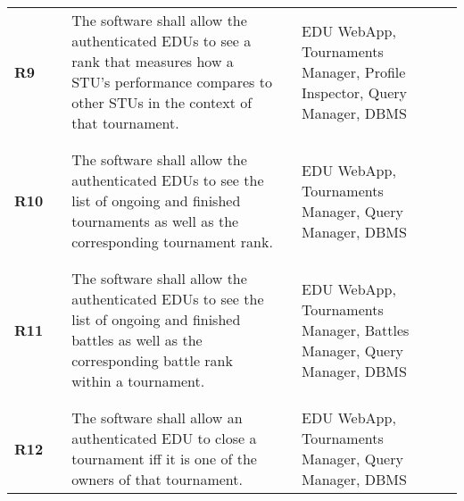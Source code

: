 \begin{longtable}[H]{l l p{6cm} l p{4cm} l}
    \textbf{R9}             & \vline & The software shall allow the authenticated EDUs to see a rank that measures how a STU's performance compares to other STUs in the context of that tournament.                                                                                                                & \vline &  EDU WebApp, Tournaments Manager, Profile Inspector, Query Manager, DBMS \\          
                            &        &                                                                                                                                                                                                                                                                              &        &       \\\hline  & & \\ 
    \textbf{R10}            & \vline & The software shall allow the authenticated EDUs to see the list of ongoing and finished tournaments as well as the corresponding tournament rank.                                                                                                                            & \vline &  EDU WebApp, Tournaments Manager, Query Manager, DBMS \\          
                            &        &                                                                                                                                                                                                                                                                              &        &       \\\hline  & & \\ 
    \textbf{R11}            & \vline & The software shall allow the authenticated EDUs to see the list of ongoing and finished battles as well as the corresponding battle rank within a tournament.                                                                                                                & \vline &  EDU WebApp, Tournaments Manager, Battles Manager, Query Manager, DBMS \\          
                            &        &                                                                                                                                                                                                                                                                              &        &       \\\hline  & & \\ 
    \textbf{R12}            & \vline & The software shall allow an authenticated EDU to close a tournament iff it is one of the owners of that tournament.                                                                                                                                                          & \vline &  EDU WebApp, Tournaments Manager, Query Manager, DBMS \\          

\end{longtable}
